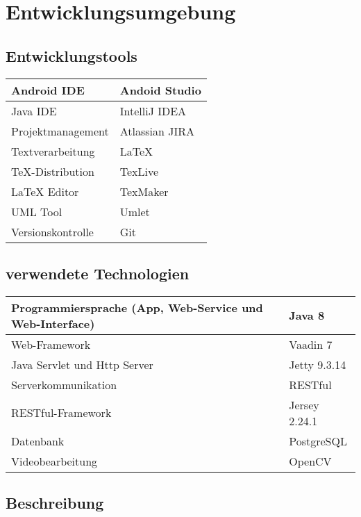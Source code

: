 \chapter{Entwicklungsumgebung}

\section{Entwicklungstools}

\begin{flushleft}
\begin{tabularx} {\textwidth}{|X|X|} \hline
Android IDE & Andoid Studio \\ \hline
Java IDE & IntelliJ IDEA \\ \hline
Projektmanagement & Atlassian JIRA \\ \hline
Textverarbeitung & LaTeX \\ \hline
TeX-Distribution & TexLive \\ \hline
LaTeX Editor & TexMaker \\ \hline
UML Tool & Umlet \\ \hline
Versionskontrolle & Git \\ \hline
\end{tabularx}
\end{flushleft}

\section{verwendete Technologien}

\begin{flushleft}
\begin{tabularx} {\textwidth}{|X|X|} \hline
Programmiersprache (App, Web-Service und Web-Interface) & Java 8 \\ \hline
Web-Framework & Vaadin 7 \\ \hline
Java Servlet und Http Server & Jetty 9.3.14 \\ \hline
Serverkommunikation & RESTful \\ \hline
RESTful-Framework & Jersey 2.24.1 \\ \hline
Datenbank & PostgreSQL \\ \hline
Videobearbeitung & OpenCV \\ \hline
\end{tabularx}
\end{flushleft}

\section{Beschreibung}

